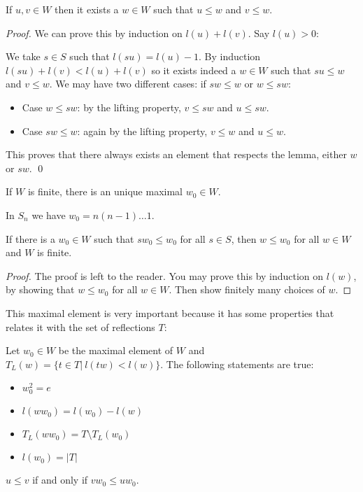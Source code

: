 \begin{lemma}
  If $u,v \in W$ then it exists a $w \in W$ such that $u \leq w$ and $v \leq w$.
\end{lemma}

\begin{proof}
  We can prove this by induction on $l(u) + l(v)$. Say $l(u) > 0$:

  We take $s \in S$ such that $l(su)= l(u) - 1$. By induction $l(su) + l(v) < l(u) + l(v)$ so it exists indeed a $w \in W$ such that $su \leq w$ and $v \leq w$. We may have two different cases: if $sw \leq w$ or $w \leq sw$:

  \begin{itemize}
    \item Case $w \leq sw$: by the lifting property, $v \leq sw$ and $u \leq sw$.
    \item Case $sw \leq w$: again by the lifting property, $v \leq w$ and $u \leq w$.
  \end{itemize}

  This proves that there always exists an element that respects the lemma, either $w$ or $sw$. \qed
\end{proof}

\begin{corollary}
If $W$ is finite, there is an unique maximal $w_0 \in W$.
\end{corollary}

\begin{example}
  In $S_n$ we have $w_0 = n(n-1) \dots 1$.
\end{example}

\begin{corollary}
  If there is a $w_0 \in W$ such that $sw_0 \leq w_0$ for all $s \in S$, then $w \leq w_0$ for all $w \in W$ and $W$ is finite.
\end{corollary}

\begin{proof}
  The proof is left to the reader. You may prove this by induction on $l(w)$, by showing that $w \leq w_0$ for all $w \in W$. Then show finitely many choices of $w$.
\end{proof}

This maximal element is very important because it has some properties that relates it with the set of reflections $T$:

\begin{proposition}
  Let $w_0 \in W$ be the maximal element of $W$ and $T_L(w) = \{t\in T |\  l(tw) < l(w)\}$. The following statements are true:
  \begin{itemize}
    \item $w_0^2 = e$
    \item $l(ww_0) = l(w_0) - l(w)$
    \item $T_L(ww_0) = T \setminus T_L(w_0)$
    \item $l(w_0) = |T|$
  \end{itemize}
\end{proposition}

\begin{corollary}
  $u \leq v$ if and only if $vw_0 \leq uw_0$.
\end{corollary}
